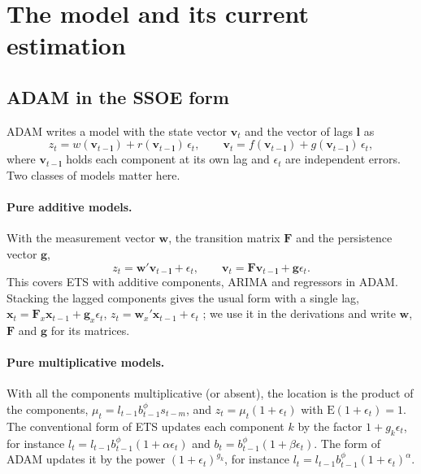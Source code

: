 \documentclass[11pt,a4paper]{article}
\newcommand{\vect}[1]{\mathbf{#1}}
\newcommand{\E}{\mathrm{E}}
\theoremstyle{remark}
\begin{document}
\section{The model and its current estimation}
\label{sec:model}

\subsection{ADAM in the SSOE form}

ADAM \citep{ADAM} writes a model with the state vector $\vect v_t$ and the vector of lags
$\vect l$ as
\begin{equation}
z_t = w(\vect v_{t-\vect l}) + r(\vect v_{t-\vect l})\,\epsilon_t, \qquad
\vect v_t = f(\vect v_{t-\vect l}) + g(\vect v_{t-\vect l})\,\epsilon_t ,
\label{eq:adam}
\end{equation}
where $\vect v_{t-\vect l}$ holds each component at its own lag and $\epsilon_t$ are independent
errors. Two classes of models matter here.

\paragraph{Pure additive models.} With the measurement vector $\vect w$, the transition matrix
$\vect F$ and the persistence vector $\vect g$,
\begin{equation}
z_t = \vect w'\vect v_{t-\vect l} + \epsilon_t, \qquad
\vect v_t = \vect F\vect v_{t-\vect l} + \vect g\epsilon_t .
\label{eq:additive}
\end{equation}
This covers ETS with additive components, ARIMA and regressors in ADAM. Stacking the lagged
components gives the usual form with a single lag, $\vect x_t = \vect F_x \vect x_{t-1} +
\vect g_x\epsilon_t$, $z_t = \vect w_x'\vect x_{t-1} + \epsilon_t$ \citep{Hyndman2008};
we use it in the derivations and write $\vect w$, $\vect F$ and $\vect g$ for its matrices.

\paragraph{Pure multiplicative models.} With all the components multiplicative (or absent), the
location is the product of the components, $\mu_t = l_{t-1} b_{t-1}^{\phi} s_{t-m}$, and
$z_t = \mu_t(1+\epsilon_t)$ with $\E(1+\epsilon_t) = 1$. The conventional form of ETS
\citep{Hyndman2008} updates each component $k$ by the factor $1+g_k\epsilon_t$, for instance
$l_t = l_{t-1}b_{t-1}^{\phi}(1+\alpha\epsilon_t)$ and $b_t = b_{t-1}^{\phi}(1+\beta\epsilon_t)$. The
form of ADAM \citep{ADAM} updates it by the power $(1+\epsilon_t)^{g_k}$, for instance
$l_t = l_{t-1}b_{t-1}^{\phi}(1+\epsilon_t)^{\alpha}$.
\end{document}
